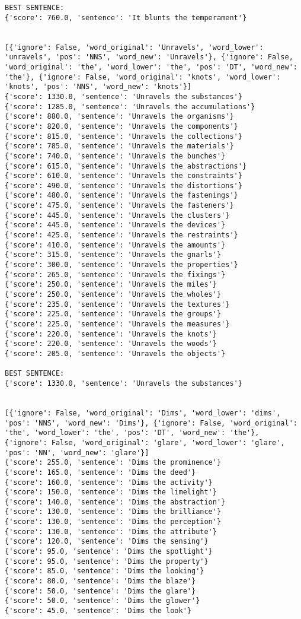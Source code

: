 \documentclass[12pt,a4paper,oneside]{book}
\begin{document}
\begin{verbatim}
BEST SENTENCE:
{'score': 760.0, 'sentence': 'It blunts the temperament'}


[{'ignore': False, 'word_original': 'Unravels', 'word_lower': 'unravels', 'pos': 'NNS', 'word_new': 'Unravels'}, {'ignore': False, 'word_original': 'the', 'word_lower': 'the', 'pos': 'DT', 'word_new': 'the'}, {'ignore': False, 'word_original': 'knots', 'word_lower': 'knots', 'pos': 'NNS', 'word_new': 'knots'}]
{'score': 1330.0, 'sentence': 'Unravels the substances'}
{'score': 1285.0, 'sentence': 'Unravels the accumulations'}
{'score': 880.0, 'sentence': 'Unravels the organisms'}
{'score': 820.0, 'sentence': 'Unravels the components'}
{'score': 815.0, 'sentence': 'Unravels the collections'}
{'score': 785.0, 'sentence': 'Unravels the materials'}
{'score': 740.0, 'sentence': 'Unravels the bunches'}
{'score': 615.0, 'sentence': 'Unravels the abstractions'}
{'score': 610.0, 'sentence': 'Unravels the constraints'}
{'score': 490.0, 'sentence': 'Unravels the distortions'}
{'score': 480.0, 'sentence': 'Unravels the fastenings'}
{'score': 475.0, 'sentence': 'Unravels the fasteners'}
{'score': 445.0, 'sentence': 'Unravels the clusters'}
{'score': 445.0, 'sentence': 'Unravels the devices'}
{'score': 425.0, 'sentence': 'Unravels the restraints'}
{'score': 410.0, 'sentence': 'Unravels the amounts'}
{'score': 315.0, 'sentence': 'Unravels the gnarls'}
{'score': 300.0, 'sentence': 'Unravels the properties'}
{'score': 265.0, 'sentence': 'Unravels the fixings'}
{'score': 250.0, 'sentence': 'Unravels the miles'}
{'score': 250.0, 'sentence': 'Unravels the wholes'}
{'score': 235.0, 'sentence': 'Unravels the textures'}
{'score': 225.0, 'sentence': 'Unravels the groups'}
{'score': 225.0, 'sentence': 'Unravels the measures'}
{'score': 220.0, 'sentence': 'Unravels the knots'}
{'score': 220.0, 'sentence': 'Unravels the woods'}
{'score': 205.0, 'sentence': 'Unravels the objects'}

BEST SENTENCE:
{'score': 1330.0, 'sentence': 'Unravels the substances'}


[{'ignore': False, 'word_original': 'Dims', 'word_lower': 'dims', 'pos': 'NNS', 'word_new': 'Dims'}, {'ignore': False, 'word_original': 'the', 'word_lower': 'the', 'pos': 'DT', 'word_new': 'the'}, {'ignore': False, 'word_original': 'glare', 'word_lower': 'glare', 'pos': 'NN', 'word_new': 'glare'}]
{'score': 255.0, 'sentence': 'Dims the prominence'}
{'score': 165.0, 'sentence': 'Dims the deed'}
{'score': 160.0, 'sentence': 'Dims the activity'}
{'score': 150.0, 'sentence': 'Dims the limelight'}
{'score': 140.0, 'sentence': 'Dims the abstraction'}
{'score': 130.0, 'sentence': 'Dims the brilliance'}
{'score': 130.0, 'sentence': 'Dims the perception'}
{'score': 130.0, 'sentence': 'Dims the attribute'}
{'score': 120.0, 'sentence': 'Dims the sensing'}
{'score': 95.0, 'sentence': 'Dims the spotlight'}
{'score': 95.0, 'sentence': 'Dims the property'}
{'score': 85.0, 'sentence': 'Dims the looking'}
{'score': 80.0, 'sentence': 'Dims the blaze'}
{'score': 50.0, 'sentence': 'Dims the glare'}
{'score': 50.0, 'sentence': 'Dims the glower'}
{'score': 45.0, 'sentence': 'Dims the look'}


\end{verbatim}
\end{document}
